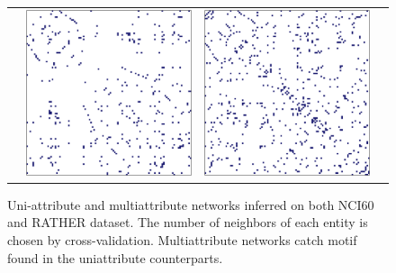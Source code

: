 \begin{figure}[htbp!]
\begin{tabular}{@{}lccc@{}}
    & \includegraphics[width=.3\textwidth]{figures/exprNet_RATHER}
    & \includegraphics[width=.3\textwidth]{figures/bivarNet_RATHER} \\
  \end{tabular}
  \caption{Uni-attribute and multiattribute networks inferred on both
    NCI60 and RATHER dataset. The number of neighbors of each entity
    is chosen by cross-validation. Multiattribute networks catch motif
    found in the uniattribute counterparts.}
  \label{fig:networks}
\end{figure}



